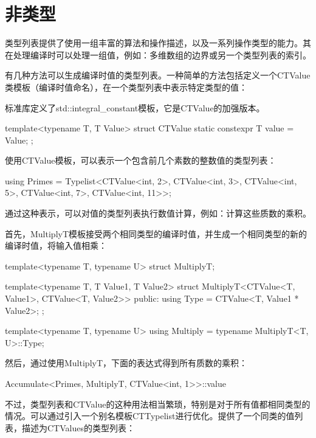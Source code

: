 \section{非类型}

类型列表提供了使用一组丰富的算法和操作描述，以及一系列操作类型的能力。其在处理编译时可以处理一组值，例如：多维数组的边界或另一个类型列表的索引。

有几种方法可以生成编译时值的类型列表。一种简单的方法包括定义一个CTValue类模板（编译时值命名），在一个类型列表中表示特定类型的值：

\begin{notice}
标准库定义了std::integral\_constant模板，它是CTValue的加强版本。
\end{notice}

\begin{cpp}
template<typename T, T Value>
struct CTValue
{
	static constexpr T value = Value;
};
\end{cpp}

使用CTValue模板，可以表示一个包含前几个素数的整数值的类型列表：

\begin{cpp}
using Primes = Typelist<CTValue<int, 2>, CTValue<int, 3>,
						CTValue<int, 5>, CTValue<int, 7>,
						CTValue<int, 11>>;
\end{cpp}

通过这种表示，可以对值的类型列表执行数值计算，例如：计算这些质数的乘积。

首先，MultiplyT模板接受两个相同类型的编译时值，并生成一个相同类型的新的编译时值，将输入值相乘：

\begin{cpp}
template<typename T, typename U>
struct MultiplyT;

template<typename T, T Value1, T Value2>
struct MultiplyT<CTValue<T, Value1>, CTValue<T, Value2>> {
	public:
	using Type = CTValue<T, Value1 * Value2>;
};

template<typename T, typename U>
using Multiply = typename MultiplyT<T, U>::Type;
\end{cpp}

然后，通过使用MultiplyT，下面的表达式得到所有质数的乘积：

\begin{cpp}
Accumulate<Primes, MultiplyT, CTValue<int, 1>>::value
\end{cpp}

不过，类型列表和CTValue的这种用法相当繁琐，特别是对于所有值都相同类型的情况。可以通过引入一个别名模板CTTypelist进行优化。提供了一个同类的值列表，描述为CTValues的类型列表：


